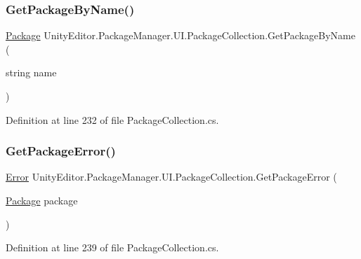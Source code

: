 \subsubsection{\texorpdfstring{GetPackageByName()}{GetPackageByName()}}
{\footnotesize\ttfamily \mbox{\hyperlink{class_unity_editor_1_1_package_manager_1_1_u_i_1_1_package}{Package}} Unity\+Editor.\+Package\+Manager.\+U\+I.\+Package\+Collection.\+Get\+Package\+By\+Name (\begin{DoxyParamCaption}\item[{string}]{name }\end{DoxyParamCaption})}



Definition at line 232 of file Package\+Collection.\+cs.

\mbox{\label{class_unity_editor_1_1_package_manager_1_1_u_i_1_1_package_collection_a05751206796fd79618b248930a0711ea}} 
\subsubsection{\texorpdfstring{GetPackageError()}{GetPackageError()}}
{\footnotesize\ttfamily \mbox{\hyperlink{namespace_unity_editor_1_1_package_manager_1_1_u_i_ab1815eb3e48074893d9dc1dc99a4a32aa902b0d55fddef6f8d651fe1035b7d4bd}{Error}} Unity\+Editor.\+Package\+Manager.\+U\+I.\+Package\+Collection.\+Get\+Package\+Error (\begin{DoxyParamCaption}\item[{\mbox{\hyperlink{class_unity_editor_1_1_package_manager_1_1_u_i_1_1_package}{Package}}}]{package }\end{DoxyParamCaption})}



Definition at line 239 of file Package\+Collection.\+cs.

\mbox{\label{class_unity_editor_1_1_package_manager_1_1_u_i_1_1_package_collection_ad4f8e8391ee918c13e8a7afb888a5b66}} 

